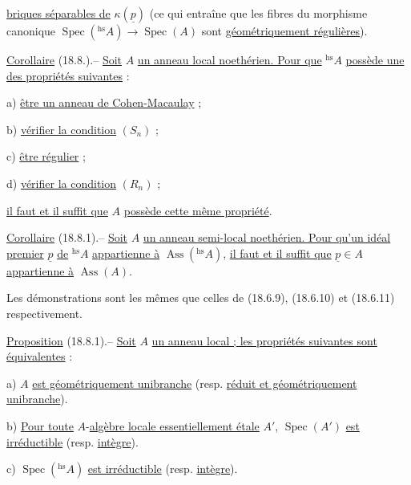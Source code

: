 
\uline{briques séparables de} $\kappa(\underline p)$ (ce qui entraîne que les fibres du morphisme canonique $\operatorname{Spec}({}^{\mathrm{hs}}A)\to\operatorname{Spec}(A)$ sont \uline{géométriquement régulières}).

\uline{Corollaire} (18.8.).-- \uline{Soit} $A$ \uline{un anneau local noethérien. Pour que} ${}^{\mathrm{hs}}A$ \uline{possède une des propriétés suivantes} :

a) \uline{être un anneau de Cohen-Macaulay} ;

b) \uline{vérifier la condition} $(S_n)$ ;

c) \uline{être régulier} ;

d) \uline{vérifier la condition} $(R_n)$ ;


\uline{il faut et il suffit que} $A$ \uline{possède cette même propriété}.

\uline{Corollaire} (18.8.1).-- \uline{Soit} $A$ \uline{un anneau semi-local noethérien. Pour qu'un idéal premier} $\underline p$ \uline{de} ${}^{\mathrm{hs}}A$ \uline{appartienne à} $\operatorname{Ass}({}^{\mathrm{hs}}A)$, \uline{il faut et il suffit que} $\underline p\in A$ \uline{appartienne à} $\operatorname{Ass}(A)$.

Les démonstrations sont les mêmes que celles de (18.6.9), (18.6.10) et (18.6.11) respectivement.

\uline{Proposition} (18.8.1).-- \uline{Soit} $A$ \uline{un anneau local ; les propriétés suivantes sont équivalentes} :

a) $A$ \uline{est géométriquement unibranche} (resp. \uline{réduit et géométriquement unibranche}).

b) \uline{Pour toute} $A$-\uline{algèbre locale essentiellement étale} $A'$, $\operatorname{Spec}(A')$ \uline{est irréductible} (resp. \uline{intègre}).

c) $\operatorname{Spec}({}^{\mathrm{hs}}A)$ \uline{est irréductible} (resp. \uline{intègre}).

